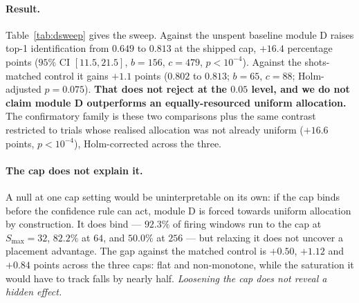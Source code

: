 \documentclass[final,5p,times,longtitle]{elsarticle}
\newcommand{\Smax}{S_{\max}}
\begin{document}
\paragraph{Result.} Table~\ref{tab:dsweep} gives the sweep. Against the
unspent baseline module D raises top-1 identification from $0.649$ to
$0.813$ at the shipped cap, $+16.4$ percentage points ($95\%$ CI
$[11.5,21.5]$, $b=156$, $c=479$, $p<10^{-4}$). Against the shots-matched
control it gains $+1.1$ points ($0.802$ to $0.813$; $b=65$, $c=88$;
Holm-adjusted $p=0.075$). \textbf{That does not reject at the $0.05$ level,
and we do not claim module D outperforms an equally-resourced uniform
allocation.} The confirmatory family is these two comparisons plus the same
contrast restricted to trials whose realised allocation was not already
uniform ($+16.6$ points, $p<10^{-4}$), Holm-corrected across the three.

\paragraph{The cap does not explain it.} A null at one cap setting would be
uninterpretable on its own: if the cap binds before the confidence rule can
act, module D is forced towards uniform allocation by construction. It does
bind --- $92.3\%$ of firing windows run to the cap at $\Smax=32$, $82.2\%$
at $64$, and $50.0\%$ at $256$ --- but relaxing it does not uncover a
placement advantage. The gap against the matched control is $+0.50$,
$+1.12$ and $+0.84$ points across the three caps: flat and non-monotone,
while the saturation it would have to track falls by nearly half.
\emph{Loosening the cap does not reveal a hidden effect.}
\end{document}
